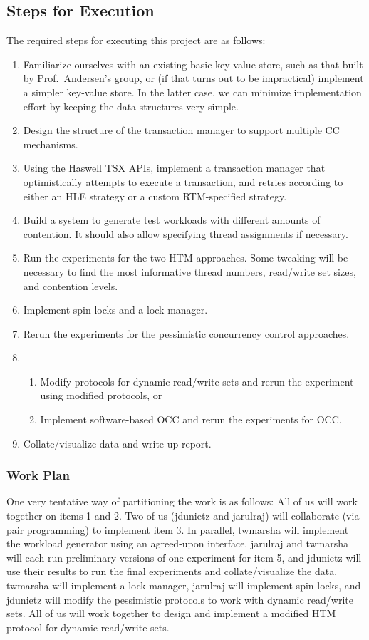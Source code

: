 \subsection{Steps for Execution}
The required steps for executing this project are as follows:
\begin{enumerate}
\item Familiarize ourselves with an existing basic key-value store, such as that
  built by Prof.\ Andersen's group, or (if that turns out to be impractical)
  implement a simpler key-value store. In the latter case, we can
  minimize implementation effort by keeping the data structures very simple.
\item Design the structure of the transaction manager to support multiple CC mechanisms.
\item Using the Haswell TSX APIs, implement a transaction manager that optimistically attempts to execute a transaction, and retries according to either an HLE strategy or a custom RTM-specified strategy.
\item Build a system to generate test workloads with different amounts of contention. It should also allow specifying thread assignments if necessary.
\item Run the experiments for the two HTM approaches. Some tweaking will be necessary to find the most informative thread numbers, read/write set sizes, and contention levels.
\item Implement spin-locks and a lock manager.
\item Rerun the experiments for the pessimistic concurrency control approaches.
\item
  \begin{enumerate}
  \item Modify protocols for dynamic read/write sets and rerun the
    experiment using modified protocols, or
  \item Implement software-based OCC and rerun the experiments for OCC.
  \end{enumerate}
\item Collate/visualize data and write up report.
\end{enumerate}

\subsubsection{Work Plan}
One very tentative way of partitioning the work is as follows: All of us will
work together on items 1 and 2. Two of us (jdunietz and jarulraj) will
collaborate (via pair programming) to implement item 3. In parallel, twmarsha
will implement the workload generator using an agreed-upon interface. jarulraj
and twmarsha will each run preliminary versions of one experiment for item 5,
and jdunietz will use their results to run the final experiments and
collate/visualize the data. twmarsha will implement a lock manager, jarulraj
will implement spin-locks, and jdunietz will modify the pessimistic protocols to
work with dynamic read/write sets. All of us will work together to design and
implement a modified HTM protocol for dynamic read/write sets.


